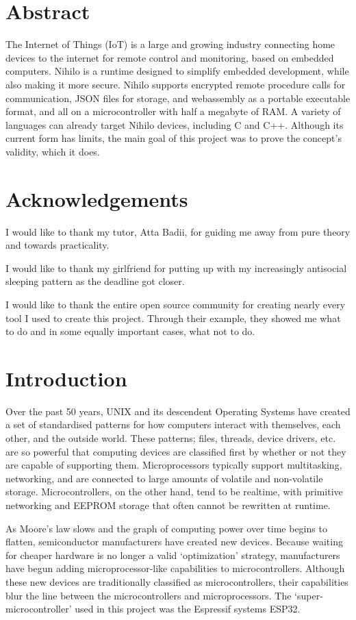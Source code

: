 \documentclass{article}
\begin{document}
\section{Abstract}
The Internet of Things (IoT) is a large and growing industry connecting home devices to the internet for remote control and monitoring, based on embedded computers. Nihilo is a runtime designed to simplify embedded development, while also making it more secure. Nihilo supports encrypted remote procedure calls for communication, JSON files for storage, and webassembly as a portable executable format, and all on a microcontroller with half a megabyte of RAM. A variety of languages can already target Nihilo devices, including C and C++. Although its current form has limits, the main goal of this project was to prove the concept's validity, which it does.

\section{Acknowledgements}
I would like to thank my tutor, Atta Badii, for guiding me away from pure theory and towards practicality.

I would like to thank my girlfriend for putting up with my increasingly antisocial sleeping pattern as the deadline got closer.

I would like to thank the entire open source community for creating nearly every tool I used to create this project. Through their example, they showed me what to do and in some equally important cases, what not to do.

\tableofcontents
\listoffigures
\listoftables
\section{Introduction}
Over the past 50 years, UNIX and its descendent Operating Systems have created a set of standardised patterns for how computers interact with themselves, each other, and the outside world.
These patterns; files, threads, device drivers, etc. are so powerful that computing devices are classified first by whether or not they are capable of supporting them.
Microprocessors typically support multitasking, networking, and are connected to large amounts of volatile and non-volatile storage.
Microcontrollers, on the other hand, tend to be realtime, with primitive networking and EEPROM storage that often cannot be rewritten at runtime.

As Moore's law slows and the graph of computing power over time begins to flatten, semiconductor manufacturers have created new devices.
Because waiting for cheaper hardware is no longer a valid \lq optimization' strategy, manufacturers have begun adding microprocessor-like capabilities to microcontrollers.
Although these new devices are traditionally classified as microcontrollers, their capabilities blur the line between the microcontrollers and microprocessors.
The \lq super-microcontroller' used in this project was the Espressif systems ESP32.
\end{document}
